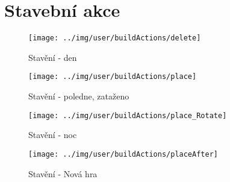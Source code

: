 
\section{Stavební akce}



\begin{figure}[h!]\centering
\texttt{[image: ../img/user/buildActions/delete]}

\caption{Stavění - den}
\label{fig:user_buildActions_delete}

\end{figure}

\begin{figure}[h!]\centering
\texttt{[image: ../img/user/buildActions/place]}

\caption{Stavění - poledne, zataženo}
\label{fig:user_buildActions_place}

\end{figure}

\begin{figure}[h!]\centering
\texttt{[image: ../img/user/buildActions/place\_Rotate]}

\caption{Stavění - noc}
\label{fig:user_buildActions_place_Rotate}

\end{figure}


\begin{figure}[h!]\centering
\texttt{[image: ../img/user/buildActions/placeAfter]}

\caption{Stavění - Nová hra}
\label{fig:user_buildActions_placeAfter}

\end{figure}
